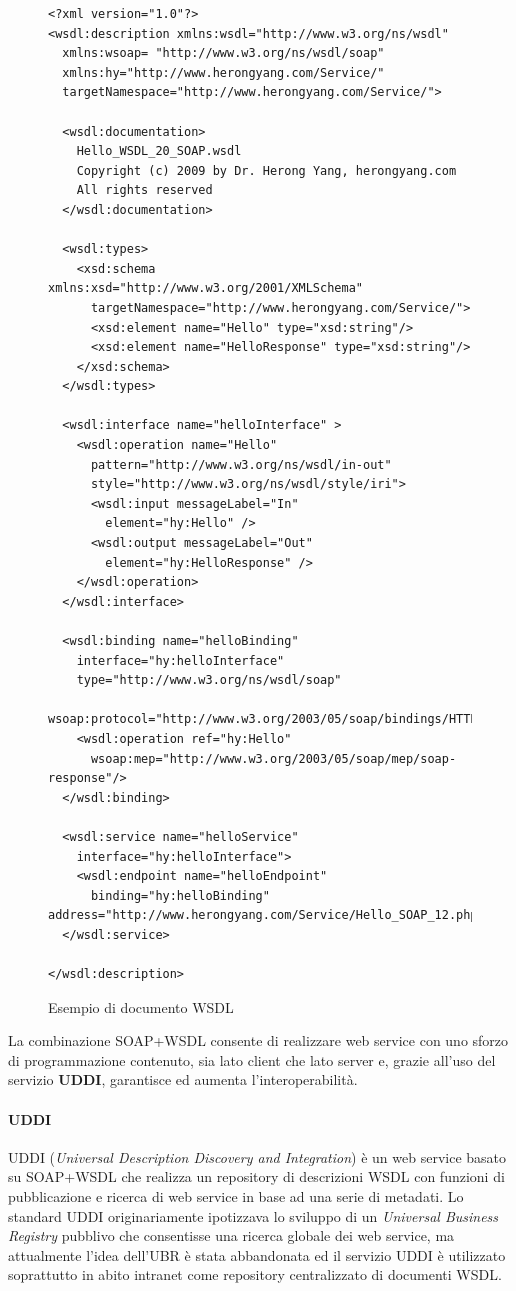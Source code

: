 \begin{figure}[h!]
\begin{center}
\lstset{language=MYXML}
\begin{lstlisting}
<?xml version="1.0"?> 
<wsdl:description xmlns:wsdl="http://www.w3.org/ns/wsdl"
  xmlns:wsoap= "http://www.w3.org/ns/wsdl/soap"
  xmlns:hy="http://www.herongyang.com/Service/"
  targetNamespace="http://www.herongyang.com/Service/">

  <wsdl:documentation>
    Hello_WSDL_20_SOAP.wsdl
    Copyright (c) 2009 by Dr. Herong Yang, herongyang.com
    All rights reserved
  </wsdl:documentation>

  <wsdl:types>
    <xsd:schema xmlns:xsd="http://www.w3.org/2001/XMLSchema"
      targetNamespace="http://www.herongyang.com/Service/">
      <xsd:element name="Hello" type="xsd:string"/>    
      <xsd:element name="HelloResponse" type="xsd:string"/>    
    </xsd:schema>    
  </wsdl:types>

  <wsdl:interface name="helloInterface" >
    <wsdl:operation name="Hello" 
      pattern="http://www.w3.org/ns/wsdl/in-out" 
      style="http://www.w3.org/ns/wsdl/style/iri">
      <wsdl:input messageLabel="In" 
        element="hy:Hello" />
      <wsdl:output messageLabel="Out" 
        element="hy:HelloResponse" />
    </wsdl:operation>
  </wsdl:interface>

  <wsdl:binding name="helloBinding" 
    interface="hy:helloInterface"
    type="http://www.w3.org/ns/wsdl/soap"
    wsoap:protocol="http://www.w3.org/2003/05/soap/bindings/HTTP/">
    <wsdl:operation ref="hy:Hello" 
      wsoap:mep="http://www.w3.org/2003/05/soap/mep/soap-response"/>
  </wsdl:binding>

  <wsdl:service name="helloService" 
    interface="hy:helloInterface">
    <wsdl:endpoint name="helloEndpoint" 
      binding="hy:helloBinding"
address="http://www.herongyang.com/Service/Hello_SOAP_12.php"/>
  </wsdl:service>

</wsdl:description>
\end{lstlisting}
\caption{Esempio di documento WSDL\label{wsdlimage}}
\end{center}
\end{figure}
La combinazione SOAP+WSDL consente di realizzare web service con uno sforzo di programmazione contenuto, sia lato client che lato server e, grazie all'uso del servizio \textbf{UDDI}, garantisce ed aumenta l'interoperabilità.
\paragraph{UDDI}
UDDI (\textit{Universal Description Discovery and Integration}) è un web service basato su SOAP+WSDL che realizza un repository di descrizioni WSDL con funzioni di pubblicazione e ricerca di web service in base ad una serie di metadati.
Lo standard UDDI originariamente ipotizzava lo sviluppo di un \textit{Universal Business Registry} pubblivo che consentisse una ricerca globale dei web service, ma attualmente l'idea dell'UBR è stata abbandonata ed il servizio UDDI è utilizzato soprattutto in abito intranet come repository centralizzato di documenti WSDL.
